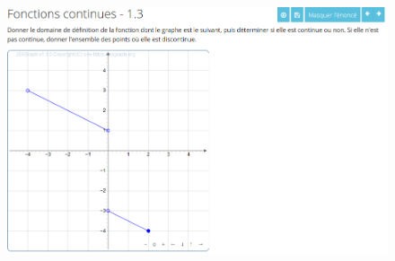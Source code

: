 \documentclass{article}
\begin{document}
\begin{figure}[!htb]
    \centering
    \includegraphics[scale=0.6]{images/graphe.png}
\end{figure}
\end{document}
